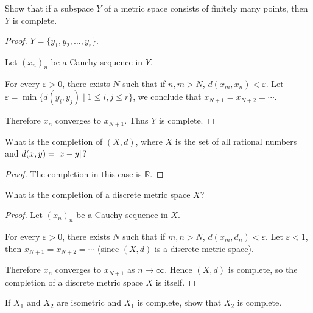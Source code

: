\begin{exercise}\label{chapter1:section6:exercise1}
    Show that if a subspace $Y$ of a metric space consists of finitely many points, then $Y$ is complete.
\end{exercise}

\begin{proof}
    $Y = \{ y_{1}, y_{2}, \ldots, y_{r} \}$.

    Let ${(x_{n})}_{n}$ be a Cauchy sequence in $Y$.

    For every $\varepsilon > 0$, there exists $N$ such that if $n, m > N$, $d(x_{m}, x_{n}) < \varepsilon$. Let $\varepsilon = \min\{ d(y_{i}, y_{j}) \mid 1\leq i,j\leq r \}$, we conclude that $x_{N+1} = x_{N+2} = \cdots$.

    Therefore $x_{n}$ converges to $x_{N+1}$. Thus $Y$ is complete.
\end{proof}

\begin{exercise}\label{chapter1:section6:exercise2}
    What is the completion of $(X, d)$, where $X$ is the set of all rational numbers and $d(x, y) = \left\vert{x - y}\right\vert$?
\end{exercise}

\begin{proof}
    The completion in this case is $\mathbb{R}$.
\end{proof}


\begin{exercise}\label{chapter1:section6:exercise3}
    What is the completion of a discrete metric space $X$?
\end{exercise}

\begin{proof}
    Let ${(x_{n})}_{n}$ be a Cauchy sequence in $X$.

    For every $\varepsilon > 0$, there exists $N$ such that if $m, n > N$, $d(x_{m}, d_{n}) < \varepsilon$. Let $\varepsilon < 1$, then $x_{N+1} = x_{N+2} = \cdots$ (since $(X, d)$ is a discrete metric space).

    Therefore $x_{n}$ converges to $x_{N+1}$ as $n\to\infty$. Hence $(X, d)$ is complete, so the completion of a discrete metric space $X$ is itself.
\end{proof}

\begin{exercise}\label{chapter1:section6:exercise4}
    If $X_{1}$ and $X_{2}$ are isometric and $X_{1}$ is complete, show that $X_{2}$ is complete.
\end{exercise}

